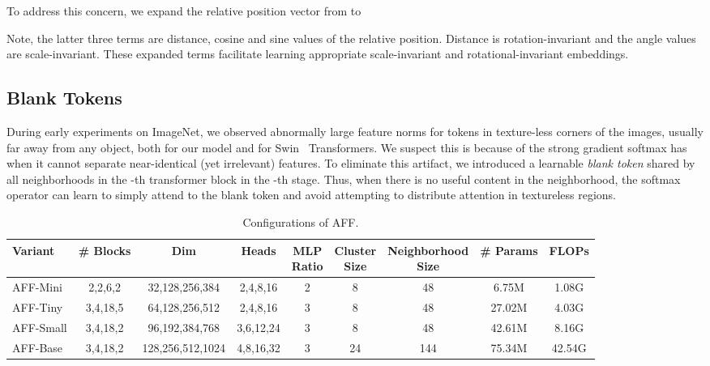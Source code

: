 \documentclass[10pt,twocolumn,letterpaper]{article}
\begin{document}
To address this concern, we expand the relative position vector from  to

Note, the latter three terms are distance, cosine and sine values of the relative position. Distance is rotation-invariant and the angle values are scale-invariant. These expanded terms facilitate learning appropriate scale-invariant and rotational-invariant embeddings.


\subsection{Blank Tokens}

During early experiments on ImageNet, we observed abnormally large feature norms for tokens in texture-less corners of the images, usually far away from any  object, both for our model and for Swin~\cite{swin} Transformers. We suspect this is because of the strong gradient softmax has when it cannot separate near-identical (yet irrelevant) features. 
To eliminate this artifact, we introduced a learnable \textit{blank token}  shared by all neighborhoods in the -th transformer block in the -th stage. Thus, when there is no useful content in the neighborhood, the softmax operator can learn to simply attend to the blank token and avoid attempting to distribute attention in textureless regions.  






\begin{table*}
\begin{center}
\begin{small}
\begin{tabular}{lcccccccc}\hline
Variant & \# Blocks & Dim & Heads & \makecell{MLP\\Ratio} & \makecell{Cluster\\ Size} & \makecell{Neighborhood\\Size} & \# Params & FLOPs\\\hline
AFF-Mini & 2,2,6,2 & 32,128,256,384 & 2,4,8,16 & 2 & 8 & 48 & 6.75M & 1.08G \\
AFF-Tiny & 3,4,18,5 & 64,128,256,512 & 2,4,8,16 & 3 & 8 & 48 & 27.02M & 4.03G \\
AFF-Small & 3,4,18,2 & 96,192,384,768 & 3,6,12,24 & 3 & 8 & 48 & 42.61M & 8.16G \\
AFF-Base & 3,4,18,2 & 128,256,512,1024 & 4,8,16,32 & 3 & 24 & 144 & 75.34M & 42.54G \\\hline 
\end{tabular}
\end{small}
\end{center}
\vspace{-0.6cm}
\caption{Configurations of AFF.}
\label{tb:config}
\vskip -0.15in
\end{table*}
\end{document}
